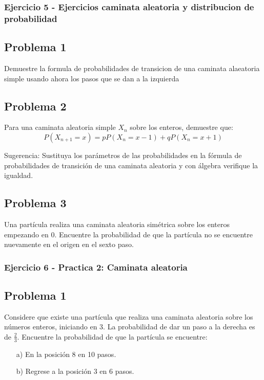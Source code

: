 \documentclass{article}
\begin{document}
\newpage

\subsubsection{Ejercicio 5 - Ejercicios caminata aleatoria y distribucion de probabilidad}

\subsection*{Problema 1}

Demuestre la formula de probabilidades de transicion de una caminata alaeatoria simple usando ahora los pasos que se dan a la izquierda

\subsection*{Problema 2}

Para una caminata aleatoria simple \(X_n\) sobre los enteros, demuestre que:
\[ P(X_{n+1} = x) = pP(X_n = x - 1) + qP(X_n = x + 1) \]

Sugerencia: Sustituya los parámetros de las probabilidades en la fórmula de probabilidades de transición de una caminata aleatoria y con álgebra verifique la igualdad.

\subsection*{Problema 3}

Una partícula realiza una caminata aleatoria simétrica sobre los enteros empezando en 0. Encuentre la probabilidad de que la partícula no se encuentre nuevamente en el origen en el sexto paso.

\subsubsection{Ejercicio 6 - Practica 2: Caminata aleatoria}

\subsection*{Problema 1}

Considere que existe una partícula que realiza una caminata aleatoria sobre los números enteros, iniciando en 3. La probabilidad de dar un paso a la derecha es de \( \frac{2}{3} \). Encuentre la probabilidad de que la partícula se encuentre:

\begin{enumerate}
    \item[a)] En la posición 8 en 10 pasos.
    \item[b)] Regrese a la posición 3 en 6 pasos.
\end{enumerate}
\end{document}
